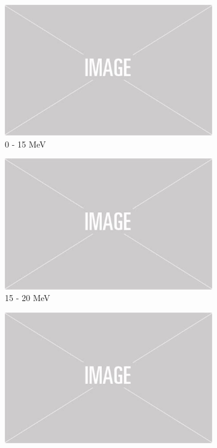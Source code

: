 \begin{figure}

	\centering
	\begin{subfigure}[b]{0.49\textwidth}
		\centering
		\includegraphics[width=\textwidth]{figures/placeholder.png}
		\caption {0 - 15 MeV}
	\end{subfigure}
	\hfill
	\begin{subfigure}[b]{0.49\textwidth}
		\centering
		\includegraphics[width=\textwidth]{figures/placeholder.png}
		\caption {15 - 20 MeV}
	\end{subfigure}
	\begin{subfigure}[b]{0.49\textwidth}
		\centering
		\includegraphics[width=\textwidth]{figures/placeholder.png}

\end{subfigure}
\end{figure}
